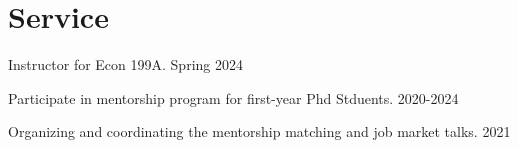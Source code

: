 
\section{Service}


{Instructor for Econ 199A.}
{Spring 2024}{}{}

{Participate in mentorship program for first-year Phd Stduents.}
{}{}{2020-2024}

{Organizing and coordinating the mentorship matching and job market talks.}
{}{}{2021}




